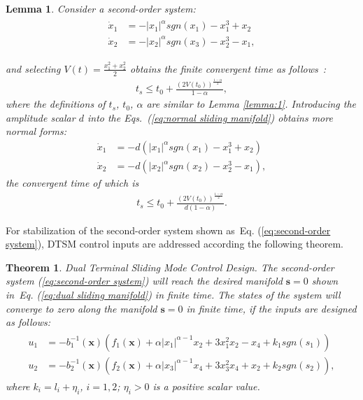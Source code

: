 \documentclass[3p]{elsarticle}
\theoremstyle{plain}
\newtheorem{mylem}{Lemma}
\newtheorem{mythm}{Theorem}
\theoremstyle{remark}
\begin{document}
\begin{mylem}
Consider a second-order system:
\begin{align}
\begin{split}
\dot x_1&=-\vert x_1\vert^\alpha sgn(x_1)-x_1^3+x_2\\
\dot x_2&=-\vert x_2\vert^\alpha sgn(x_3)-x_2^3-x_1,\label{eq:normal sliding manifold}
\end{split}
\end{align}\par
and selecting $V(t) = \frac{x_1^2+x_2^2}{2}$ obtains the finite convergent time as follows~\cite{moulay2006finite}:
\begin{align}
t_s\le t_0+\frac{(2V(t_0))^{\frac{1-\alpha}{2}}}{1-\alpha},
\end{align}
where the definitions of  $t_s$, $t_0$, $\alpha$ are similar to Lemma \ref{lemma:1}. Introducing the amplitude scalar $d$ into the Eqs.~(\ref{eq:normal sliding manifold}) obtains  more normal forms:
\begin{align}
\dot x_1&=-d(\vert x_1\vert^\alpha sgn(x_1)-x_1^3+x_2)\\
\dot x_2&=-d(\vert x_2\vert^\alpha sgn(x_2)-x_2^3-x_1),\label{eq:more normal sliding manifold}
\end{align}
the convergent time of which is
\begin{align}
t_s\le t_0+\frac{(2V(t_0))^{\frac{1-\alpha}{2}}}{d(1-\alpha)}.
\end{align}\label{lemma:2}
\end{mylem}
For stabilization of the second-order system shown as~Eq. (\ref{eq:second-order system}), DTSM control inputs are addressed according the following theorem.
\begin{mythm}\label{theorem:1}Dual Terminal Sliding Mode Control Design.
The second-order system (\ref{eq:second-order system}) will reach the desired manifold $\bm s = 0$ shown in~Eq. (\ref{eq:dual sliding manifold}) in finite time. The states of the system will converge to zero along the manifold $\bm s=0$ in finite time, if the inputs are designed as follows:
\begin{align}
\begin{split}
u_1 &= -b_1^{-1}(\bm x)(f_1(\bm x)+\alpha\vert x_1\vert^{\alpha-1}x_2+3x_1^2x_2-x_4+k_1sgn(s_1))\\
u_2 &= -b_2^{-1}(\bm x)(f_2(\bm x)+\alpha\vert x_3\vert^{\alpha-1}x_4+3x_3^2x_4+x_2+k_2sgn(s_2)),\label{eq:DSM input}
\end{split}
\end{align}
where $k_i = l_i+\eta_i$, $i=1,2$; $\eta_i>0$ is a positive scalar value.
\end{mythm}
\end{document}
